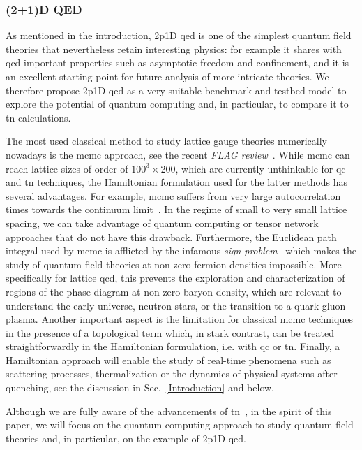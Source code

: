 \subsubsection{(2+1)D QED}
\label{subsubsect_2+1QED}
As mentioned in the introduction, \gls{2p1D} \gls{qed} is one of the simplest quantum field theories that nevertheless retain interesting physics: for example it shares with \gls{qcd} important properties such as asymptotic freedom and confinement, and it is an excellent starting point for future analysis of more intricate theories.
We therefore propose \gls{2p1D} \gls{qed} as a very suitable benchmark and testbed model to explore the potential of quantum computing and, in particular, to compare it to \gls{tn} calculations.

The most used classical method to study lattice gauge theories numerically nowadays is the \gls{mcmc} approach, see the recent \textit{FLAG review}~\cite{FlavourLatticeAveragingGroupFLAG:2021npn}. While \gls{mcmc} can reach lattice sizes of order of $100^3\times 200$, which are currently unthinkable for \gls{qc} and \gls{tn} techniques, the Hamiltonian formulation used for the latter methods has several advantages.
For example, \gls{mcmc} suffers from very large autocorrelation times towards the continuum limit~\cite{Schaefer:2010hu}. In the regime of small to very small lattice spacing, we can take advantage of quantum computing or tensor network approaches that do not have this drawback. 
Furthermore, the Euclidean path integral used by \gls{mcmc} is afflicted by the infamous \textit{sign problem}~\cite{Troyer2005} which makes the study of quantum field theories at non-zero fermion densities impossible. More specifically for lattice \gls{qcd}, this prevents the exploration and characterization of regions of the phase diagram at non-zero baryon density, which are relevant to understand the early universe, neutron stars, or the transition to a quark-gluon plasma.  
Another important aspect is the limitation for classical \gls{mcmc} techniques in the presence of a topological term which, in stark contrast, can be treated  straightforwardly in the Hamiltonian formulation, i.e. with \gls{qc} or \gls{tn}. Finally, a Hamiltonian approach will enable the study of real-time phenomena such as scattering processes, thermalization or the dynamics of physical systems after quenching, see the discussion in Sec.~\ref{Introduction} and below.

Although we are fully aware of the advancements of \gls{tn}~\cite{Banuls2019SimulatingLG}, in the spirit of this paper, we will focus on the quantum computing approach to study quantum field theories and, in particular, on the example of \gls{2p1D} \gls{qed}.

